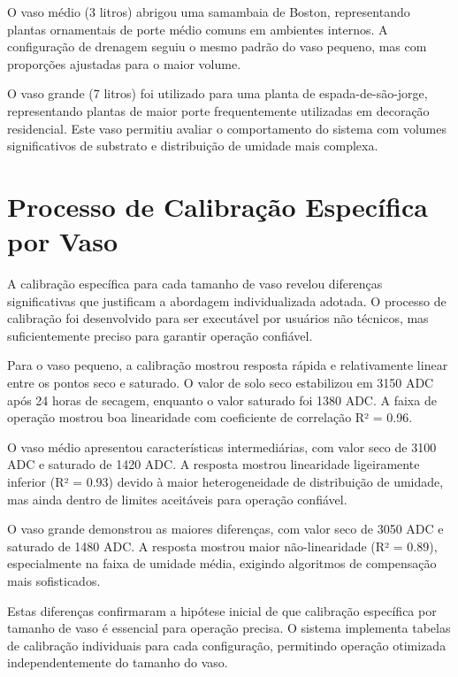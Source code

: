 \documentclass[twoside,english,brazilian]{UNISINOSmonografia}
\begin{document}
O vaso médio (3 litros) abrigou uma samambaia de Boston, representando plantas ornamentais de porte médio comuns em ambientes internos. A configuração de drenagem seguiu o mesmo padrão do vaso pequeno, mas com proporções ajustadas para o maior volume.

O vaso grande (7 litros) foi utilizado para uma planta de espada-de-são-jorge, representando plantas de maior porte frequentemente utilizadas em decoração residencial. Este vaso permitiu avaliar o comportamento do sistema com volumes significativos de substrato e distribuição de umidade mais complexa.


\section{Processo de Calibração Específica por Vaso}

A calibração específica para cada tamanho de vaso revelou diferenças significativas que justificam a abordagem individualizada adotada. O processo de calibração foi desenvolvido para ser executável por usuários não técnicos, mas suficientemente preciso para garantir operação confiável.

Para o vaso pequeno, a calibração mostrou resposta rápida e relativamente linear entre os pontos seco e saturado. O valor de solo seco estabilizou em 3150 ADC após 24 horas de secagem, enquanto o valor saturado foi 1380 ADC. A faixa de operação mostrou boa linearidade com coeficiente de correlação R² = 0.96.

O vaso médio apresentou características intermediárias, com valor seco de 3100 ADC e saturado de 1420 ADC. A resposta mostrou linearidade ligeiramente inferior (R² = 0.93) devido à maior heterogeneidade de distribuição de umidade, mas ainda dentro de limites aceitáveis para operação confiável.

O vaso grande demonstrou as maiores diferenças, com valor seco de 3050 ADC e saturado de 1480 ADC. A resposta mostrou maior não-linearidade (R² = 0.89), especialmente na faixa de umidade média, exigindo algoritmos de compensação mais sofisticados.

Estas diferenças confirmaram a hipótese inicial de que calibração específica por tamanho de vaso é essencial para operação precisa. O sistema implementa tabelas de calibração individuais para cada configuração, permitindo operação otimizada independentemente do tamanho do vaso.
\end{document}
